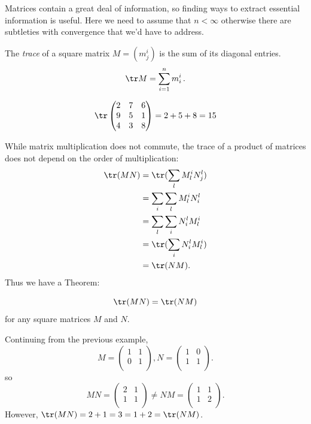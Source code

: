 Matrices contain a great deal of information, so finding ways to extract essential information is useful. Here we need to assume that $n < \infty$ otherwise there are subtleties with convergence that we'd have to address.

\begin{definition}
The \emph{trace} of a square matrix $M=(m_j^i)$ is the sum of its diagonal entries.
\[
\tr M = \sum_{i=1}^{n}m_i^i\, .
\]
\end{definition}

\begin{example}
\[
\tr \begin{pmatrix}
2 & 7 & 6\\
9 & 5 & 1\\
4 & 3 & 8\\
\end{pmatrix} = 2+5+8 = 15
\]
\end{example}
While matrix multiplication does not commute, the trace of a product of matrices does not depend on the order of multiplication:
\begin{align*}
\tr(MN) & = \tr( \sum_l M_l^i N_j^l ) \\
& = \sum_i \sum_l M_l^i N_i^l \\
& = \sum_l \sum_i N_i^l M_l^i \\
& = \tr( \sum_i N_i^l M_l^i ) \\
& = \tr( NM ).
\end{align*}
Thus we have a Theorem:
\begin{theorem} \[\tr(MN)=\tr(NM)\] for any square matrices $M$ and $N$.
\end{theorem}

\begin{example}
Continuing from the previous example, 
\[
M= \begin{pmatrix}
1 & 1 \\
0 & 1 \\
\end{pmatrix}, N=
\begin{pmatrix}
1 & 0 \\
1 & 1 \\
\end{pmatrix}.
\]
so
\[
MN = \begin{pmatrix}
2 & 1 \\
1 & 1 \\
\end{pmatrix} \neq
NM = \begin{pmatrix}
1 & 1 \\
1 & 2 \\
\end{pmatrix}.
\]
However, $\tr(MN) = 2+1 = 3 = 1+2 = \tr(NM)$.
\end{example}

